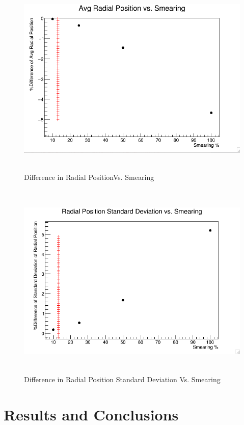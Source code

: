 \documentclass[./Thesis]{subfiles}
\begin{document}
\begin{figure}
	\centerline{\includegraphics[height=95mm]{AvgRadialSmear.png}}
	\caption[AverageRadialSmear]{Difference in Radial PositionVs. Smearing}
	\label{fig:AvgRadSmear}
\end{figure} 

\begin{figure}
	\centerline{\includegraphics[height=95mm]{stdRadialSmear.png}}
	\caption[Standard DeviationRadialSmear]{Difference in Radial Position Standard Deviation Vs. Smearing}
	\label{fig:StdRadSmear}
\end{figure} 


\section{Results and Conclusions}
\end{document}
